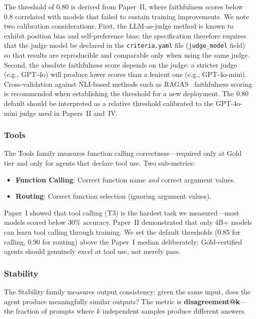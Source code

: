 \documentclass[11pt]{article}
\newcommand{\criteriayaml}{\texttt{criteria.yaml}}
\begin{document}
The threshold of 0.80 is derived from Paper~II, where faithfulness scores below 0.8 correlated with models that failed to sustain training improvements. We note two calibration considerations. First, the LLM-as-judge method is known to exhibit position bias and self-preference bias; the specification therefore requires that the judge model be declared in the \criteriayaml{} file (\texttt{judge\_model} field) so that results are reproducible and comparable only when using the same judge. Second, the absolute faithfulness score depends on the judge: a stricter judge (e.g., GPT-4o) will produce lower scores than a lenient one (e.g., GPT-4o-mini). Cross-validation against NLI-based methods such as RAGAS~\citep{es2023ragas} faithfulness scoring is recommended when establishing the threshold for a new deployment. The 0.80 default should be interpreted as a relative threshold calibrated to the GPT-4o-mini judge used in Papers~II and~IV.

\subsubsection{Tools}

The Tools family measures function calling correctness---required only at Gold tier and only for agents that declare tool use. Two sub-metrics:

\begin{itemize}[leftmargin=12pt]
  \item \textbf{Function Calling}: Correct function name \emph{and} correct argument values.
  \item \textbf{Routing}: Correct function selection (ignoring argument values).
\end{itemize}

Paper~I showed that tool calling (T3) is the hardest task we measured---most models scored below 30\% accuracy. Paper~II demonstrated that only 4B+ models can learn tool calling through training. We set the default thresholds (0.85 for calling, 0.90 for routing) above the Paper~I median deliberately: Gold-certified agents should genuinely excel at tool use, not merely pass.

\subsubsection{Stability}

The Stability family measures output consistency: given the same input, does the agent produce meaningfully similar outputs? The metric is \textbf{disagreement@k}---the fraction of prompts where $k$ independent samples produce different answers.
\end{document}
